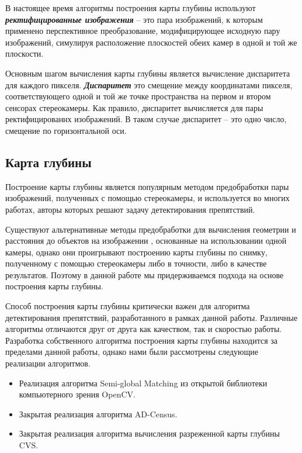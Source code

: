 \documentclass[aps,%
14pt,%
final,%
oneside,
onecolumn,%
musixtex, %
superscriptaddress,%
centertags]{extarticle} %
\begin{document}
В настоящее время алгоритмы построения карты глубины используют \textbf{\textit{ректифицированные изображения}} -- это пара изображений, к которым применено перспективное преобразование, модифицирующее исходную пару изображений, симулируя расположение плоскостей обеих камер в одной и той же плоскости.

Основным шагом вычисления карты глубины является вычисление диспаритета для каждого пикселя. \textbf{\textit{Диспаритет}} это смещение между координатами пикселя, соответствующего одной и той же точке пространства на первом и втором сенсорах стереокамеры. Как правило, диспаритет вычисляется для пары ректифицированнх изображений. В таком случае диспаритет -- это одно число, смещение по горизонтальной оси.

\subsection{Карта глубины}

Построение карты глубины является популярным методом предобработки пары изображений, полученных с помощью стереокамеры, и используется во многих работах, авторы которых решают задачу детектирования препятствий.

Существуют альтернативные методы предобработки для вычисления геометрии и расстояния до объектов на изображении \cite{monodepth17}\cite{koenderink1991affine}, основанные на использовании одной камеры, однако они проигрывают построению карты глубины по снимку, полученному с помощью стереокамеры либо в точности, либо в качестве результатов. Поэтому в данной работе мы придерживаемся подхода на основе построения карты глубины.

Способ построения карты глубины критически важен для алгоритма детектирования препятствий, разработанного в рамках данной работы. Различные алгоритмы отличаются друг от друга как качеством, так и скоростью работы. Разработка собственного алгоритма построения карты глубины находится за пределами данной работы, однако нами были рассмотрены следующие реализации алгоритмов.
\begin{itemize}
\item Реализация алгоритма Semi-global Matching из открытой библиотеки компьютерного зрения OpenCV\cite{itseez2015opencv}.
\item Закрытая реализация алгоритма AD-Census.
\item Закрытая реализация алгоритма вычисления разреженной карты глубины CVS.
\end{itemize}
\end{document}
